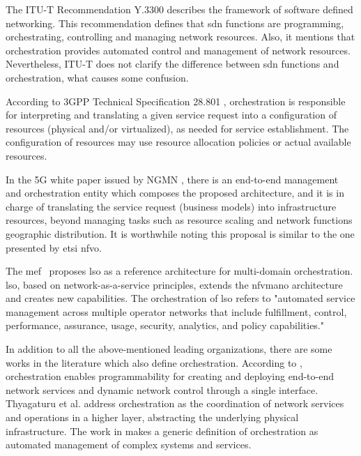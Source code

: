 The ITU-T Recommendation Y.3300 \cite{InternationalTelecommunicationUnion2014ITU-TNetworking} describes the framework of software defined networking. This recommendation defines that \gls{sdn} functions are programming, orchestrating, controlling and managing network resources. Also, it mentions that orchestration provides automated control and management of network resources. Nevertheless, ITU-T does not clarify the difference between \gls{sdn} functions and orchestration, what causes some confusion.

According to 3GPP Technical Specification 28.801 \cite{3GPP2017TRNetwork}, orchestration is responsible for interpreting and translating a given service request into a configuration of resources (physical and/or virtualized), as needed for service establishment. The configuration of resources may use resource allocation policies or actual available resources. 

In the 5G white paper issued by NGMN \cite{NGMNAlliance2015NGMNPaper}, there is an end-to-end management and orchestration entity which composes the proposed architecture, and it is in charge of translating the service request (business models) into infrastructure resources, beyond managing tasks such as resource scaling and network functions geographic distribution. It is worthwhile noting this proposal is similar to the one presented by \gls{etsi} \gls{nfvo}.  

The \gls{mef}~\cite{MEF:Third:2015} proposes \gls{lso} as a reference architecture for multi-domain orchestration. \gls{lso}, based on network-as-a-service principles, extends the \gls{nfvmano} architecture and creates new capabilities. The orchestration of \gls{lso} refers to "automated service management across multiple operator networks that include fulfillment, control, performance, assurance, usage, security, analytics, and policy capabilities."

In addition to all the above-mentioned leading organizations, there are some works in the literature which also define orchestration. According to \cite{Rostami2016Multi-Domain5G}, orchestration enables programmability for creating and deploying end-to-end network services and dynamic network control through a single interface. Thyagaturu et al. \cite{Thyagaturu2016SoftwareSurvey} address orchestration as the coordination of network services and operations in a higher layer, abstracting the underlying physical infrastructure. The work in \cite{Guerzoni2016Multi-domainApproach} makes a generic definition of orchestration as automated management of complex systems and services.

